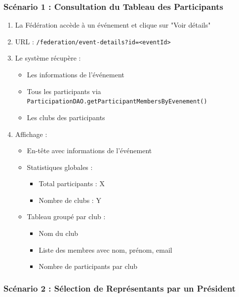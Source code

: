 \documentclass[12pt,a4paper]{article}
\begin{document}
\subsubsection{Scénario 1 : Consultation du Tableau des Participants}

\begin{enumerate}
    \item La Fédération accède à un événement et clique sur "Voir détails"
    \item URL : \texttt{/federation/event-details?id=<eventId>}
    \item Le système récupère :
    \begin{itemize}
        \item Les informations de l'événement
        \item Tous les participants via \texttt{ParticipationDAO.getParticipantMembersByEvenement()}
        \item Les clubs des participants
    \end{itemize}
    \item Affichage :
    \begin{itemize}
        \item En-tête avec informations de l'événement
        \item Statistiques globales :
        \begin{itemize}
            \item Total participants : X
            \item Nombre de clubs : Y
        \end{itemize}
        \item Tableau groupé par club :
        \begin{itemize}
            \item Nom du club
            \item Liste des membres avec nom, prénom, email
            \item Nombre de participants par club
        \end{itemize}
    \end{itemize}
\end{enumerate}

\subsubsection{Scénario 2 : Sélection de Représentants par un Président}
\end{document}
